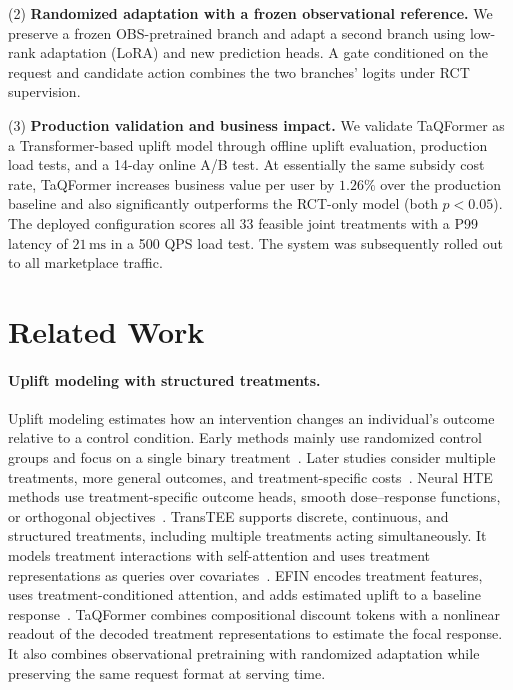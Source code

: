 \documentclass[sigconf,nonacm]{acmart}
\newcommand{\model}{TaQFormer\xspace}
\begin{document}
(2) \textbf{Randomized adaptation with a frozen observational reference.}
We preserve a frozen OBS-pretrained branch and adapt a second branch using low-rank adaptation (LoRA) and new prediction heads. A gate conditioned on the request and candidate action combines the two branches' logits under RCT supervision.

(3) \textbf{Production validation and business impact.}
We validate \model as a Transformer-based uplift model through offline uplift evaluation, production load tests, and a 14-day online A/B test. At essentially the same subsidy cost rate, \model increases business value per user by $1.26\%$ over the production baseline and also significantly outperforms the RCT-only model (both $p<0.05$). The deployed configuration scores all 33 feasible joint treatments with a P99 latency of $21\,\mathrm{ms}$ in a 500 QPS load test. The system was subsequently rolled out to all marketplace traffic.

\section{Related Work}

\paragraph{Uplift modeling with structured treatments.}
Uplift modeling estimates how an intervention changes an individual's outcome relative to a control condition. Early methods mainly use randomized control groups and focus on a single binary treatment~\cite{radcliffe2007using,gutierrez2017causal}. Later studies consider multiple treatments, more general outcomes, and treatment-specific costs~\cite{olaya2020survey,zhao2017multiple,zhao2019cost}. Neural HTE methods use treatment-specific outcome heads, smooth dose--response functions, or orthogonal objectives~\cite{shi2019adapting,lu2021vcnet,chernozhukov2022riesznet}. TransTEE supports discrete, continuous, and structured treatments, including multiple treatments acting simultaneously. It models treatment interactions with self-attention and uses treatment representations as queries over covariates~\cite{zhang2023exploring}. EFIN encodes treatment features, uses treatment-conditioned attention, and adds estimated uplift to a baseline response~\cite{liu2023explicit}. \model combines compositional discount tokens with a nonlinear readout of the decoded treatment representations to estimate the focal response. It also combines observational pretraining with randomized adaptation while preserving the same request format at serving time.
\end{document}
